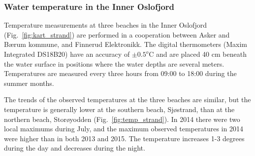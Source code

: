 
\newpage
\subsubsection{Water temperature in the Inner Oslofjord}

Temperature measurements at three beaches in the Inner Oslofjord (Fig.~\ref{fig:kart_strand}) are performed in a cooperation between Asker and B{\ae}rum kommune, and Finnerud Elektronikk. The digital thermometers (Maxim Integrated DS18B20) have an accuracy of $\pm 0.5^o$C and are placed 40 cm beneath the water surface in positions where the water depths are several meters. Temperatures are measured every three hours from 09:00 to 18:00 during the summer months. 

The trends of the observed temperatures at the three beaches are similar, but the temperature is generally lower at the southern beach, Sj{\o}strand, than at the northern beach, Stor{\o}yodden (Fig.~\ref{fig:temp_strand}). In 2014 there were two local maximums during July, and the maximum observed temperatures in 2014 were higher than in both 2013 and 2015. The temperature increases 1-3 degrees during the day and decreases during the night.

